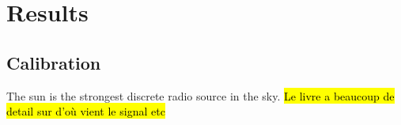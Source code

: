 \section{Results}
\subsection{Calibration}
The sun is the strongest discrete radio source in the sky\cite{burke_introduction_2013}. \hl{Le livre a beaucoup de detail sur d'où vient le signal etc}